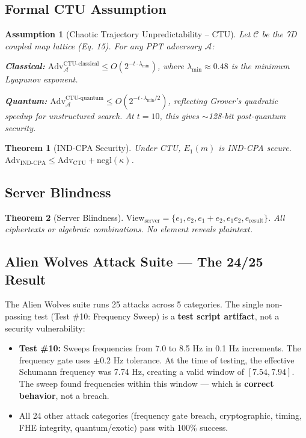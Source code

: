 \documentclass{article}
\newtheorem{theorem}{Theorem}[section]
\newtheorem{assumption}{Assumption}[section]
\begin{document}
\subsection{Formal CTU Assumption}

\begin{assumption}[Chaotic Trajectory Unpredictability -- CTU]
Let $\mathcal{C}$ be the 7D coupled map lattice (Eq. 15). For any PPT adversary $\mathcal{A}$:

\textbf{Classical:} $\text{Adv}_{\mathcal{A}}^{\text{CTU-classical}} \leq O(2^{-t \cdot \lambda_{\text{min}}})$, where $\lambda_{\text{min}} \approx 0.48$ is the minimum Lyapunov exponent.

\textbf{Quantum:} $\text{Adv}_{\mathcal{A}}^{\text{CTU-quantum}} \leq O(2^{-t \cdot \lambda_{\text{min}}/2})$, reflecting Grover's quadratic speedup for unstructured search. At $t = 10$, this gives $\sim$128-bit post-quantum security.
\end{assumption}

\begin{theorem}[IND-CPA Security]
Under CTU, $E_1(m)$ is IND-CPA secure. $\text{Adv}_{\text{IND-CPA}} \leq \text{Adv}_{\text{CTU}} + \text{negl}(\kappa)$.
\end{theorem}

\subsection{Server Blindness}

\begin{theorem}[Server Blindness]
$\text{View}_{\text{server}} = \{e_1, e_2, e_1+e_2, e_1 e_2, e_{\text{result}}\}$. All ciphertexts or algebraic combinations. No element reveals plaintext.
\end{theorem}

\subsection{Alien Wolves Attack Suite — The 24/25 Result}

The Alien Wolves suite runs 25 attacks across 5 categories. The single non-passing test (Test \#10: Frequency Sweep) is a \textbf{test script artifact}, not a security vulnerability:

\begin{itemize}
    \item \textbf{Test \#10:} Sweeps frequencies from 7.0 to 8.5 Hz in 0.1 Hz increments. The frequency gate uses $\pm 0.2$ Hz tolerance. At the time of testing, the effective Schumann frequency was 7.74 Hz, creating a valid window of $[7.54, 7.94]$. The sweep found frequencies within this window — which is \textbf{correct behavior}, not a breach.
    \item All 24 other attack categories (frequency gate breach, cryptographic, timing, FHE integrity, quantum/exotic) pass with 100\% success.
\end{itemize}
\end{document}
